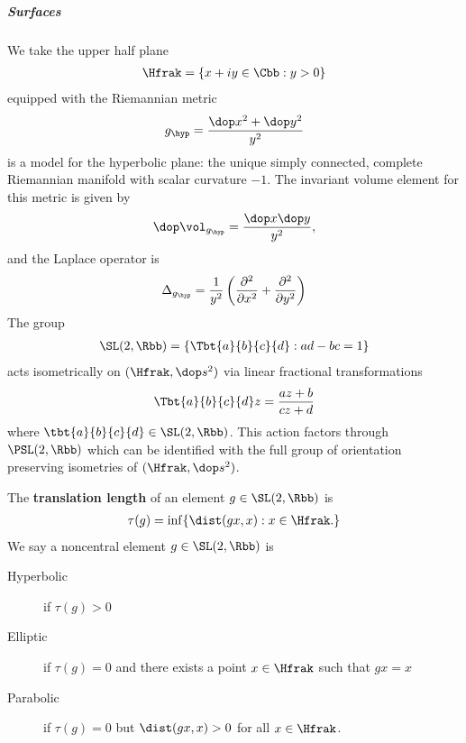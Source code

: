 \subparagraph{Surfaces}
We take the upper half plane
\begin{align*}
  \Hfrak = \{ x+iy \in \Cbb : y >0\}
\end{align*}
equipped with the Riemannian metric
\begin{align*}
  g_\hyp = \frac{\dop x^2 +\dop y^2}{y^2}
\end{align*}
is a model for the hyperbolic plane: the unique simply connected, complete Riemannian manifold with scalar curvature $-1$. The invariant volume element for this metric is given by
\begin{align*}
  \dop \vol_{g_\hyp} = \frac{\dop x \dop y}{y^2},
\end{align*}
and the Laplace operator is
\begin{align*}
  \Delta_{g_\hyp} = \frac{1}{y^2}\left( \frac{\partial^2 }{\partial x^2}+ \frac{\partial^2 }{\partial y^2} \right)
\end{align*} The group
\begin{align*}
  \SL(2,\Rbb) = \left\{ \Tbt{a}{b}{c}{d}: ad-bc =1 \right\}
\end{align*}
acts isometrically on $(\Hfrak,\dop s^2)$  via linear fractional transformations
\begin{align*}
  \Tbt{a}{b}{c}{d} z = \frac{az+b}{cz+d} %
\end{align*}
where $\tbt{a}{b}{c}{d} \in \SL(2,\Rbb)$.  This action factors through $\PSL(2,\Rbb)$ which can be identified with the full group of orientation preserving isometries of $(\Hfrak,\dop s^2)$.

The \textbf{translation length} of an element $g\in \SL(2,\Rbb)$ is
\begin{align}
  \tau(g) = \inf \{ \dist(gx,x) : x\in \Hfrak.\}
\end{align}
We say a noncentral element $g\in \SL(2,\Rbb)$ is
\begin{description}
  \item[Hyperbolic] if $\tau(g) >0$
  \item[Elliptic] if $\tau(g) = 0$ and there exists a point $x \in \Hfrak$ such that $gx =x$
  \item[Parabolic] if $\tau(g) = 0$ but $\dist(gx,x)>0$ for all $x\in \Hfrak$.
\end{description}

